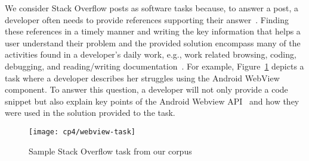 We consider Stack Overflow posts as software tasks because, to answer a post,
a developer often needs to provide references
supporting their answer~\cite{yazdaninia2021}.
Finding these references in a timely manner and writing the key information that helps a user understand 
their problem and the provided solution encompass many of the activities found in a developer's daily work, e.g., work related browsing, coding, debugging, and reading/writing documentation~\cite{Meyer2017}.
For example, Figure~\ref{fig:webview-task} depicts a task where a developer 
describes her struggles using the Android WebView component.
To answer this question, a developer will not only provide a code snippet but 
also explain key points of the Android Webview API~\cite{apiWebView}
and how they were used in the solution provided to the task.

\begin{figure}
    \centering
    \texttt{[image: cp4/webview-task]}
    \caption{Sample Stack Overflow task from our corpus}
    \label{fig:webview-task}
\end{figure}